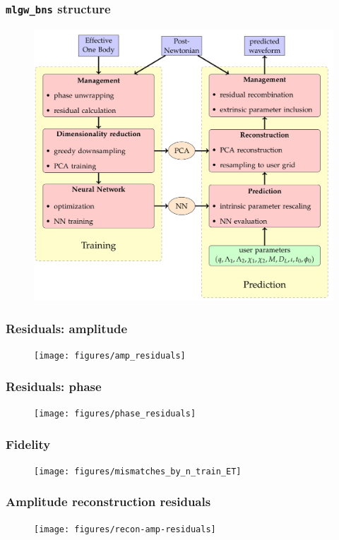 \documentclass{beamer}
\begin{document}
\begin{frame}
    \frametitle{\texttt{mlgw\_bns} structure}
    \vspace*{-.3cm}
    \begin{figure}[ht]
    \centering
    \includegraphics[width=.775\textwidth]{figures/flowchart}
    \label{fig:flowchart}
    \end{figure}
\end{frame}

\begin{frame}
    \frametitle{Residuals: amplitude}
    \begin{figure}[ht]
    \centering
    \texttt{[image: figures/amp\_residuals]}
    \label{fig:amp_residuals}
    \end{figure}
\end{frame}

\begin{frame}
    \frametitle{Residuals: phase}
    \begin{figure}[ht]
    \centering
    \texttt{[image: figures/phase\_residuals]}
    \label{fig:phase_residuals}
    \end{figure}
\end{frame}

\begin{frame}
    \frametitle{Fidelity}
    \begin{figure}[ht]
    \centering
    \texttt{[image: figures/mismatches\_by\_n\_train\_ET]}
    \end{figure}
\end{frame}

\begin{frame}
    \frametitle{Amplitude reconstruction residuals}
    \begin{figure}[ht]
    \centering
    \texttt{[image: figures/recon-amp-residuals]}
    \label{fig:recon-amp-residuals}
    \end{figure}
\end{frame}
\end{document}
